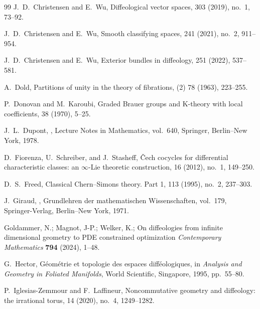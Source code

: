 \documentclass[11pt]{amsart}
\begin{document}
\begin{thebibliography}{99}
J.~D.~Christensen and E.~Wu,
\newblock Diffeological vector spaces,
 303 (2019), no.~1, 73--92.

J.~D.~Christensen and E.~Wu,
\newblock Smooth classifying spaces,
 241 (2021), no.~2, 911--954.

J.~D.~Christensen and E.~Wu,
\newblock Exterior bundles in diffeology,
 251 (2022), 537--581.



A.~Dold,
\newblock Partitions of unity in the theory of fibrations,
 (2) 78 (1963), 223--255.

P.~Donovan and M.~Karoubi,
\newblock Graded Brauer groups and K-theory with local coefficients,
 38 (1970), 5--25.

J.~L.~Dupont,
,
\newblock Lecture Notes in Mathematics, vol.~640,
\newblock Springer, Berlin--New York, 1978.

D.~Fiorenza, U.~Schreiber, and J.~Stasheff,
\newblock \v{C}ech cocycles for differential characteristic classes:
\newblock an $\infty$-Lie theoretic construction,
 16 (2012), no.~1, 149--250.

D.~S.~Freed,
\newblock Classical Chern--Simons theory. Part 1,
 113 (1995), no.~2, 237--303.

J.~Giraud,
,
\newblock Grundlehren der mathematischen Wissenschaften, vol.~179,
\newblock Springer-Verlag, Berlin--New York, 1971.

	 Goldammer, N.; Magnot, J-P.; Welker, K.; On diffeologies from infinite dimensional geometry to PDE constrained optimization \emph{Contemporary Mathematics} {\bf 794} (2024), 1--48.

G.~Hector,
\newblock G\'eom\'etrie et topologie des espaces diff\'eologiques,
\newblock in {\em Analysis and Geometry in Foliated Manifolds},
\newblock World Scientific, Singapore, 1995, pp.~55--80.

P.~Iglesias-Zemmour and F.~Laffineur,
\newblock Noncommutative geometry and diffeology: the irrational torus,
 14 (2020), no.~4, 1249--1282.


\end{thebibliography}
\end{document}
